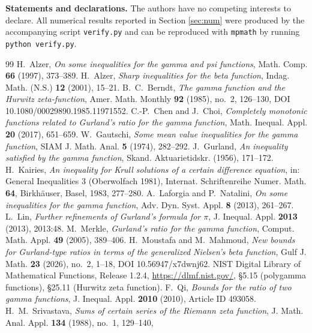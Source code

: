 \documentclass[11pt,a4paper]{amsart}
\theoremstyle{definition}
\begin{document}
\medskip
\noindent\textbf{Statements and declarations.} The authors have no competing interests to
declare. All numerical results reported in Section \ref{sec:num} were produced by the
accompanying script \texttt{verify.py} and can be reproduced with \texttt{mpmath}
by running \texttt{python verify.py}.

\begin{thebibliography}{99}
 H.~Alzer, \emph{On some inequalities for the gamma and psi functions},
Math. Comp. \textbf{66} (1997), 373--389.
 H.~Alzer, \emph{Sharp inequalities for the beta function}, Indag. Math.
(N.S.) \textbf{12} (2001), 15--21.
 B.~C.~Berndt, \emph{The gamma function and the Hurwitz zeta-function},
Amer. Math. Monthly \textbf{92} (1985), no.~2, 126--130,
DOI 10.1080/00029890.1985.11971552.
 C.-P.~Chen and J.~Choi, \emph{Completely monotonic functions related
to Gurland's ratio for the gamma function}, Math. Inequal. Appl. \textbf{20} (2017),
651--659.
 W.~Gautschi, \emph{Some mean value inequalities for the gamma
function}, SIAM J. Math. Anal. \textbf{5} (1974), 282--292.
 J.~Gurland, \emph{An inequality satisfied by the gamma function},
Skand. Aktuarietidskr. (1956), 171--172.
 H.~Kairies, \emph{An inequality for Krull solutions of a certain
difference equation}, in: General Inequalities 3 (Oberwolfach 1981), Internat.
Schriftenreihe Numer. Math. \textbf{64}, Birkh\"auser, Basel, 1983, 277--280.
 A.~Laforgia and P.~Natalini, \emph{On some inequalities for
the gamma function}, Adv. Dyn. Syst. Appl. \textbf{8} (2013), 261--267.
 L.~Lin, \emph{Further refinements of Gurland's formula for $\pi$},
J. Inequal. Appl. \textbf{2013} (2013), 2013:48.
 M.~Merkle, \emph{Gurland's ratio for the gamma function},
Comput. Math. Appl. \textbf{49} (2005), 389--406.
 H.~Moustafa and M.~Mahmoud, \emph{New bounds for Gurland-type
ratios in terms of the generalized Nielsen's beta function}, Gulf J. Math. \textbf{23}
(2026), no.~2, 1--18, DOI 10.56947/x7dwnj62.
 NIST Digital Library of Mathematical Functions, Release 1.2.4,
\url{https://dlmf.nist.gov/}, \S5.15 (polygamma
functions), \S25.11 (Hurwitz zeta function).
 F.~Qi, \emph{Bounds for the ratio of two gamma functions},
J. Inequal. Appl. \textbf{2010} (2010), Article ID 493058.
 H.~M.~Srivastava, \emph{Sums of certain series of the Riemann zeta
function}, J. Math. Anal. Appl. \textbf{134} (1988), no.~1, 129--140,

\end{thebibliography}
\end{document}
